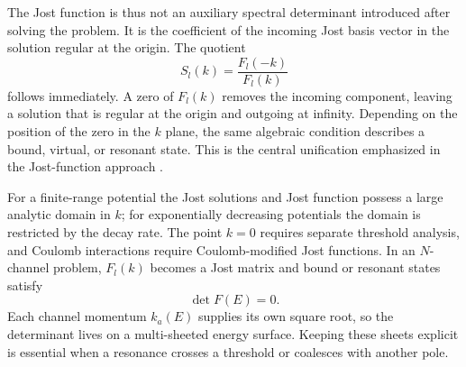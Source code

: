 The Jost function is thus not an auxiliary spectral determinant introduced
after solving the problem.  It is the coefficient of the incoming Jost basis
vector in the solution regular at the origin.  The quotient
\begin{equation}
  S_l(k)=\frac{F_l(-k)}{F_l(k)}
  \label{eq:S-Jost-foundation}
\end{equation}
follows immediately.  A zero of $F_l(k)$ removes the incoming component,
leaving a solution that is regular at the origin and outgoing at infinity.
Depending on the position of the zero in the $k$ plane, the same algebraic
condition describes a bound, virtual, or resonant state.  This is the central
unification emphasized in the Jost-function approach
\cite{Rakityansky:2022Jost}.

For a finite-range potential the Jost solutions and Jost function possess a
large analytic domain in $k$; for exponentially decreasing potentials the
domain is restricted by the decay rate.  The point $k=0$ requires separate
threshold analysis, and Coulomb interactions require Coulomb-modified Jost
functions.  In an $N$-channel problem, $F_l(k)$ becomes a Jost matrix and
bound or resonant states satisfy
\begin{equation}
  \det F(E)=0 .
  \label{eq:multichannel-jost-determinant}
\end{equation}
Each channel momentum $k_a(E)$ supplies its own square root, so the determinant
lives on a multi-sheeted energy surface.  Keeping these sheets explicit is
essential when a resonance crosses a threshold or coalesces with another
pole.
